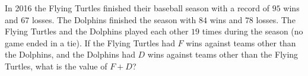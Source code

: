 In 2016 the Flying Turtles finished their baseball season with a record of $95$ wins and $67$ losses. The Dolphins finished the season with $84$ wins and $78$ losses. The Flying Turtles and the Dolphins played each other $19$ times during the season (no game ended in a tie). If the Flying Turtles had $F$ wins against teams other than the Dolphins, and the Dolphins had $D$ wins against teams other than the Flying Turtles, what is the value of $F+D$?
